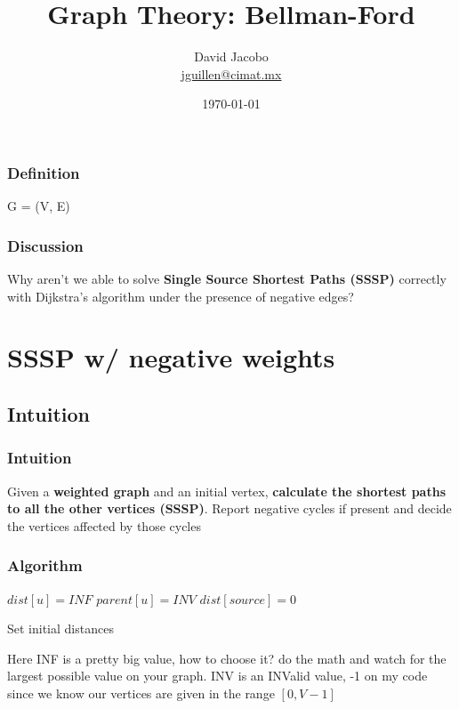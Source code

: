 \documentclass[article]{beamer}
\title{Graph Theory: Bellman-Ford}
\author{David Jacobo \\ \href{mailto:jguillen@cimat.mx}{jguillen@cimat.mx}}
\date{\scriptsize{\today}}
\begin{document}
\maketitle			
			
\begin{frame}
\frametitle{Definition}
\begin{center}
\huge
	G = (V, E)
	
\vspace{8mm}	
	
\end{center}
\end{frame}

\begin{frame}
\frametitle{Discussion}
\begin{center} 
Why aren't we able to solve \textbf{Single Source Shortest Paths (SSSP)} correctly with Dijkstra's algorithm under the presence of negative edges?
\end{center}
\end{frame}


\section{SSSP w/ negative weights}
\subsection{Intuition}
\begin{frame}
	\frametitle{Intuition}
	
	Given a \textbf{weighted graph} and an initial vertex, \textbf{calculate the shortest paths to all the other vertices (SSSP)}. Report negative cycles if present and decide the vertices affected by those cycles

\end{frame}

\begin{frame}
	\frametitle{Algorithm}
	
		\begin{algorithm}[H]
		\begin{algorithmic}[1]			
		\STATE $dist[u] = INF$
		\STATE $parent[u] = INV$
		\ENDFOR
		\STATE $dist[source] = 0$
		
		\end{algorithmic}
		\caption{Set initial distances}
		\label{alg:seq}
		\end{algorithm}	
	
\vspace{5mm}

Here INF is a pretty big value, how to choose it? do the math and watch for the largest possible value on your graph. INV is an INValid value, -1 on my code since we know our vertices are given in the range $[0,V-1]$	
	
\end{frame}
\end{document}
